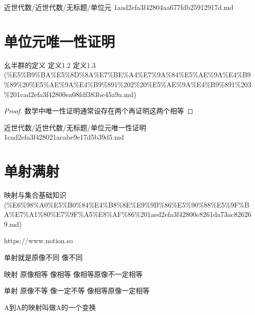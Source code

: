 \begin{note}[来源路径]

近世代数/近世代数/无标题/单位元 1aad2efa3f42804aa677fdb25912917d.md

\end{note}

\section*{单位元唯一性证明}

\begin{note}[来源上级主题]

幺半群的定义 定义1.2 定义1.3 (\%E5\%B9\%BA\%E5\%8D\%8A\%E7\%BE\%A4\%E7\%9A\%84\%E5\%AE\%9A\%E4\%B9\%89\%20\%E5\%AE\%9A\%E4\%B9\%891\%202\%20\%E5\%AE\%9A\%E4\%B9\%891\%203\%201cad2efa3f42800ea08fdf383be45a9a.md)

\end{note}

\begin{proof}

数学中唯一性证明通常设存在两个再证明这两个相等

\end{proof}

\begin{note}[来源路径]

近世代数/近世代数/无标题/单位元唯一性证明 1cad2efa3f428021acabe9e17d5b39d5.md

\end{note}

\section*{单射满射}

\begin{note}[来源上级主题]

映射与集合基础知识 (\%E6\%98\%A0\%E5\%B0\%84\%E4\%B8\%8E\%E9\%9B\%86\%E5\%90\%88\%E5\%9F\%BA\%E7\%A1\%80\%E7\%9F\%A5\%E8\%AF\%86\%201aed2efa3f42800c8261da73ac826269.md)

\end{note}

\begin{note}[单射满射]

https://www.notion.so

单射就是原像不同 像不同

映射 原像相等 像相等  像相等原像不一定相等

单射 原像不等 像一定不等 像相等原像一定相等

A到A的映射叫做A的一个变换

\end{note}

